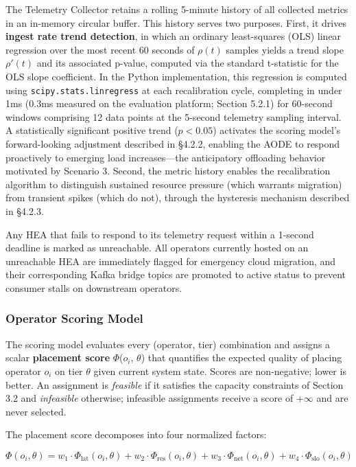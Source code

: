 \documentclass[preprint,review,12pt]{elsarticle}
\begin{document}
The Telemetry Collector retains a rolling 5-minute history of all collected metrics in an in-memory circular buffer. This history serves two purposes. First, it drives \textbf{ingest rate trend detection}, in which an ordinary least-squares (OLS) linear regression over the most recent 60 seconds of $\rho(t)$ samples yields a trend slope $\rho'(t)$ and its associated p-value, computed via the standard t-statistic for the OLS slope coefficient. In the Python implementation, this regression is computed using \texttt{scipy.stats.linregress} \cite{scipy2020} at each recalibration cycle, completing in under 1ms (0.3ms measured on the evaluation platform; Section 5.2.1) for 60-second windows comprising 12 data points at the 5-second telemetry sampling interval. A statistically significant positive trend ($p < 0.05$) activates the scoring model's forward-looking adjustment described in §4.2.2, enabling the AODE to respond proactively to emerging load increases—the anticipatory offloading behavior motivated by Scenario 3. Second, the metric history enables the recalibration algorithm to distinguish sustained resource pressure (which warrants migration) from transient spikes (which do not), through the hysteresis mechanism described in §4.2.3.

Any HEA that fails to respond to its telemetry request within a 1-second deadline is marked as unreachable. All operators currently hosted on an unreachable HEA are immediately flagged for emergency cloud migration, and their corresponding Kafka bridge topics are promoted to active status to prevent consumer stalls on downstream operators.

\subsubsection{Operator Scoring Model}\label{operator-scoring-model}

The scoring model evaluates every (operator, tier) combination and assigns a scalar \textbf{placement score} $\Phi$($o_i$, $\theta$) that quantifies the expected quality of placing operator $o_i$ on tier $\theta$ given current system state. Scores are non-negative; lower is better. An assignment is \emph{feasible} if it satisfies the capacity constraints of Section 3.2 and \emph{infeasible} otherwise; infeasible assignments receive a score of +$\infty$ and are never selected.

The placement score decomposes into four normalized factors:


\begin{equation}
\Phi(o_i, \theta) = w_1 \cdot \Phi_{\text{lat}}(o_i, \theta) + w_2 \cdot \Phi_{\text{res}}(o_i, \theta) + w_3 \cdot \Phi_{\text{net}}(o_i, \theta) + w_4 \cdot \Phi_{\text{slo}}(o_i, \theta)
\label{eq:scoring}
\end{equation}
\end{document}
